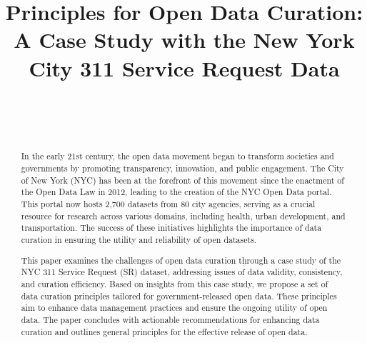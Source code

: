 \documentclass[linenumber]{jdsart}
\begin{document}
\begin{frontmatter}
  
\title{Principles for Open Data Curation: A Case Study with the New
York City 311 Service Request Data}

\author[1]{~}
\author[2]{~}
\address[1]{, }
\address[2]{Department of Statistics,
  , }



 \tableofcontents %
 \listoffigures %
 \listoftables %


\begin{abstract}
In the early 21st century, the open data movement began to transform 
societies and governments by promoting transparency,
innovation, and public engagement. The City of New York (NYC) has been at
the forefront of this movement since the enactment of the Open 
Data Law in 2012, leading to the creation of the NYC Open Data
portal. This portal now hosts 2,700 datasets from 80 city agencies,
serving as a crucial resource for research across various domains, 
including health, urban development, and transportation. The 
success of these initiatives highlights the importance of data 
curation in ensuring the utility and reliability of open datasets.


This paper examines the challenges of open data curation through a
case study of the NYC 311 Service Request (SR) dataset, addressing issues 
of data validity, consistency, and curation efficiency. Based on 
insights from this case study, we propose a set of data curation 
principles tailored for government\mbox{-}released open data. These principles 
aim to enhance data management practices and ensure 
the ongoing utility of open data. The paper concludes with 
actionable recommendations for enhancing data curation and outlines
general principles for the effective release of open data.

\end{abstract}

\begin{keywords}
\end{keywords}

\end{frontmatter}
\end{document}
